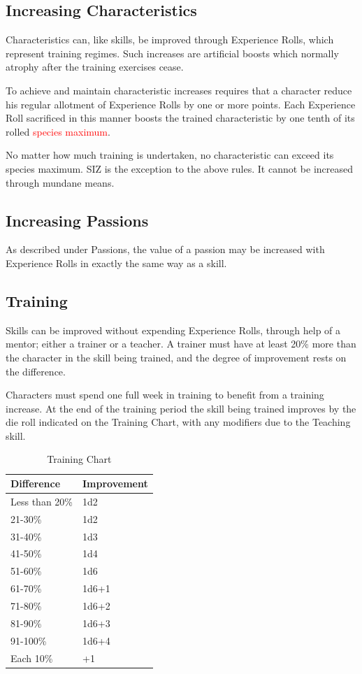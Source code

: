 \documentclass[10pt]{article}
\begin{document}
\subsection{Increasing Characteristics}
\label{sec:characteristic-improvement}
Characteristics can, like skills, be improved through Experience Rolls, which represent training regimes. Such increases are artificial boosts which normally atrophy after the training exercises cease.

To achieve and maintain characteristic increases requires that a character reduce his regular allotment of Experience Rolls by one or more points. Each Experience Roll sacrificed in this manner boosts the trained characteristic by one tenth of its rolled \textcolor{red}{species maximum}.

No matter how much training is undertaken, no characteristic can exceed its species maximum. SIZ is the exception to the above rules. It cannot be increased through mundane means.

\subsection{Increasing Passions}
\label{sec:passions-improvement}
As described under Passions, the value of a passion may be increased with Experience Rolls in exactly the same way as a skill.

\subsection{Training}
\label{sec:training}

Skills can be improved without expending Experience Rolls, through help of a mentor; either a trainer or a teacher. A trainer must have at least 20\% more than the character in the skill being trained, and the degree of improvement rests on the difference.

Characters must spend one full week in training to benefit from a training increase. At the end of the training period the skill being trained improves by the die roll indicated on the Training Chart, with any modifiers due to the Teaching skill.

\begin{table}[h]
\centering
\caption{Training Chart}
\label{tab:training}
\begin{tabular}{ll}
\toprule
\textbf{Difference} & \textbf{Improvement} \\
\midrule
Less than 20\% & 1d2 \\
21-30\% & 1d2 \\
31-40\% & 1d3 \\
41-50\% & 1d4 \\
51-60\% & 1d6 \\
61-70\% & 1d6+1 \\
71-80\% & 1d6+2 \\
81-90\% & 1d6+3 \\
91-100\% & 1d6+4 \\
Each 10\% & +1 \\
\bottomrule
\end{tabular}
\end{table}
\end{document}
